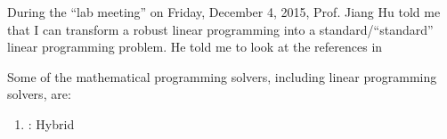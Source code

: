 During the ``lab meeting'' on Friday, December 4, 2015, Prof. Jiang Hu told me that I can transform a robust linear programming into a standard/``standard'' linear programming problem. He told me to look at the references in 

Some of the mathematical programming solvers, including linear programming solvers, are: \vspace{-0.3cm}
\begin{enumerate} \itemsep -4pt
\item \cite{Innovation24Staff2015}: Hybrid
\end{enumerate}




























































